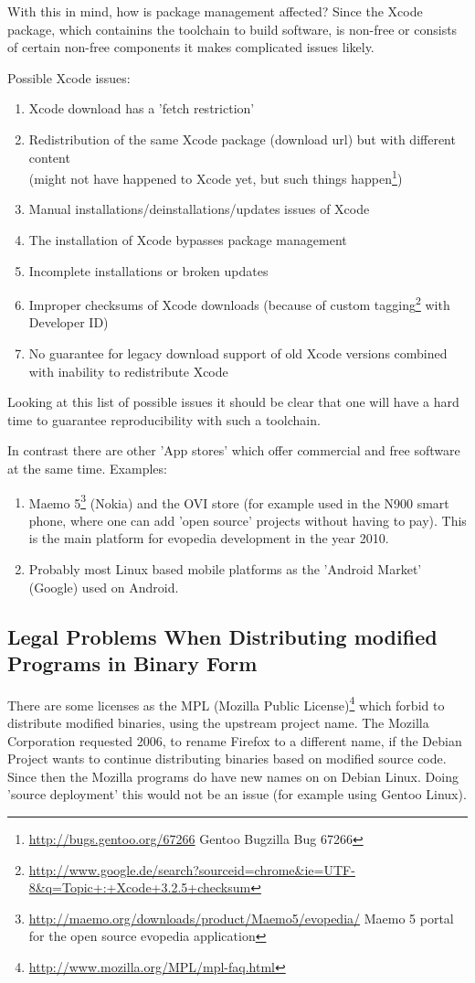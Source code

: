 \documentclass[a4paper,10pt]{article}
\begin{document}
With this in mind, how is package management affected? Since the Xcode package, which containins the toolchain to build software, is non-free or consists of certain non-free components it makes complicated issues likely. 

\newpage
Possible Xcode issues:
\begin{enumerate}
 \item Xcode download has a 'fetch restriction'
 \item Redistribution of the same Xcode package (download url) but with different content \\
       (might not have happened to Xcode yet, but such things happen\footnote{\url{http://bugs.gentoo.org/67266} Gentoo Bugzilla Bug 67266})
 \item Manual installations/deinstallations/updates issues of Xcode
 \item The installation of Xcode bypasses package management
 \item Incomplete installations or broken updates
 \item Improper checksums of Xcode downloads (because of custom tagging\footnote{\url{http://www.google.de/search?sourceid=chrome&ie=UTF-8&q=Topic+:+Xcode+3.2.5+checksum}} with Developer ID)
 \item No guarantee for legacy download support of old Xcode versions combined with inability to redistribute Xcode
\end{enumerate}
Looking at this list of possible issues it should be clear that one will have a hard time to guarantee reproducibility with such a toolchain.

In contrast there are other 'App stores' which offer commercial and free software at the same time. Examples:
\begin{enumerate}
 \item Maemo 5\footnote{\url{http://maemo.org/downloads/product/Maemo5/evopedia/} Maemo 5 portal for the open source evopedia application} (Nokia) and the OVI store (for example used in the N900 smart phone, where one can add 'open source' projects without having to pay). This is the main platform for evopedia development in the year 2010.
 \item Probably most Linux based mobile platforms as the 'Android Market' (Google) used on Android.

\end{enumerate}

\subsection{Legal Problems When Distributing modified Programs in Binary Form} 
There are some licenses as the MPL (Mozilla Public License)\footnote{\url{http://www.mozilla.org/MPL/mpl-faq.html}} which forbid to distribute modified binaries, using the upstream project name. The Mozilla Corporation requested 2006, to rename Firefox to a different name, if the Debian Project wants to continue distributing binaries based on modified source code. Since then the Mozilla programs do have new names on on Debian Linux. Doing 'source deployment' this would not be an issue (for example using Gentoo Linux).
\end{document}
